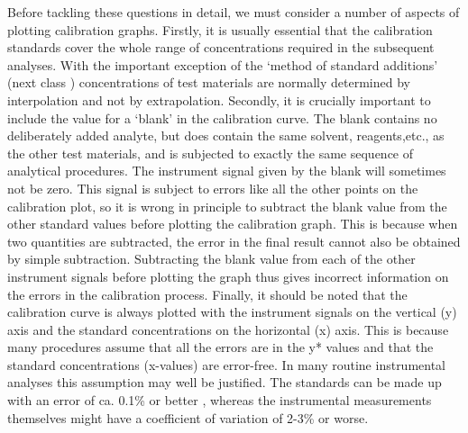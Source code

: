 Before tackling these questions in detail, we must consider a number of aspects of plotting calibration graphs.
Firstly, it is usually essential that the calibration standards cover the whole range of concentrations required in the subsequent analyses. With the important exception of the ‘method of standard additions’ (next class ) concentrations of test materials are normally determined by interpolation and not by extrapolation.
Secondly, it is crucially important to include the value for a ‘blank’ in the calibration curve. The blank contains no deliberately added analyte, but does contain the same solvent, reagents,etc., as the other test materials, and is subjected to exactly the same sequence of analytical procedures.
The instrument signal given by the blank will sometimes not be zero. This signal is subject to errors like all the other points on the calibration plot, so it is wrong in principle to subtract the blank value from the other standard values before plotting the calibration graph.
This is because when two quantities are subtracted, the error in the final result cannot also be obtained by simple subtraction. Subtracting the blank value from each of the other instrument signals before plotting the graph thus gives incorrect information on the errors in the calibration process.
Finally, it should be noted that the calibration curve is always plotted with the instrument signals on the vertical (y) axis and the standard concentrations on the horizontal (x) axis.
This is because many procedures assume that all the errors are in the y* values and that the standard concentrations (x-values) are error-free.
In many routine instrumental analyses this assumption may well be justified. The standards can be made up with an error of ca. 0.1\% or better , whereas the instrumental measurements themselves might have a coefficient of variation of 2-3\% or worse.


